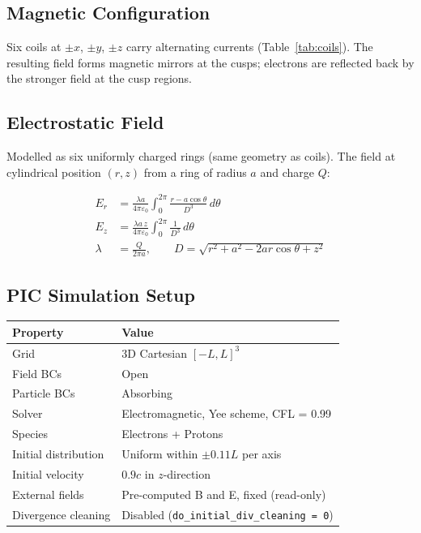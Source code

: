 \documentclass[11pt, a4paper]{article}
\begin{document}
\subsection{Magnetic Configuration}

Six coils at $\pm x$, $\pm y$, $\pm z$ carry alternating currents (Table~\ref{tab:coils}).
The resulting field forms magnetic mirrors at the cusps; electrons are reflected back by
the stronger field at the cusp regions.

\subsection{Electrostatic Field}

Modelled as six uniformly charged rings (same geometry as coils).
The field at cylindrical position $(r,z)$ from a ring of radius $a$ and charge $Q$:

\begin{align}
E_r &= \frac{\lambda a}{4\pi\varepsilon_0}
       \int_0^{2\pi} \frac{r - a\cos\theta}{D^3}\,d\theta \\[6pt]
E_z &= \frac{\lambda a\,z}{4\pi\varepsilon_0}
       \int_0^{2\pi} \frac{1}{D^3}\,d\theta \\[4pt]
\lambda &= \frac{Q}{2\pi a}, \qquad
D = \sqrt{r^2 + a^2 - 2ar\cos\theta + z^2}
\end{align}

\subsection{PIC Simulation Setup}

\begin{longtable}{L{5cm} L{9cm}}
\toprule
\textbf{Property} & \textbf{Value} \\
\midrule
Grid               & 3D Cartesian $[-L,L]^3$ \\
Field BCs          & Open \\
Particle BCs       & Absorbing \\
Solver             & Electromagnetic, Yee scheme, CFL = 0.99 \\
Species            & Electrons + Protons \\
Initial distribution & Uniform within $\pm 0.11L$ per axis \\
Initial velocity   & $0.9c$ in $z$-direction \\
External fields    & Pre-computed B and E, fixed (read-only) \\
Divergence cleaning & Disabled (\texttt{do\_initial\_div\_cleaning = 0}) \\
\bottomrule
\end{longtable}
\end{document}
